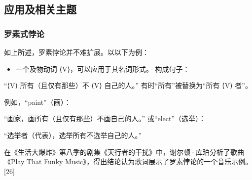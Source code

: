 \subsection{应用及相关主题}  
\subsubsection{罗素式悖论}  
如上所述，罗素悖论并不难扩展。以以下为例：
\begin{itemize}
\item 一个及物动词 ⟨V⟩，可以应用于其名词形式。  
构成句子：
\end{itemize}
“⟨V⟩ 所有（且仅有那些）不 ⟨V⟩ 自己的人。”  
有时“所有”被替换为“所有 ⟨V⟩ 者”。

例如，“paint”（画）：

“画家，画所有（且仅有那些）不画自己的人。”  
或“elect”（选举）：

“选举者（代表），选举所有不选举自己的人。”

在《生活大爆炸》第八季的剧集《天行者的干扰》中，谢尔顿·库珀分析了歌曲《Play That Funky Music》，得出结论认为歌词展示了罗素悖论的一个音乐示例。[26]
